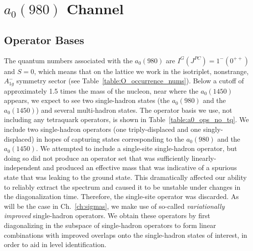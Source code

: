 \section{$a_0(980)$ Channel}\label{sec:a0}
\subsection{Operator Bases}
The quantum numbers associated with the $a_0(980)$ are $I^G(J^{PC}) = 1^-(0^{++})$ and $S = 0$, which means that on the lattice we work in the isotriplet, nonstrange, $A_{1g}^-$ symmetry sector (see Table~\ref{table:O_occurrence_nums}). Below a cutoff of approximately 1.5 times the mass of the nucleon, near where the $a_0(1450)$ appears, we expect to see two single-hadron states (the $a_0(980)$ and the $a_0(1450)$) and several multi-hadron states. The operator basis we use, not including any tetraquark operators, is shown in Table~\ref{table:a0_ops_no_tq}. We include two single-hadron operators (one triply-displaced and one singly-displaced) in hopes of capturing states corresponding to the $a_0(980)$ and the $a_0(1450)$. We attempted to include a single-site single-hadron operator, but doing so did not produce an operator set that was sufficiently linearly-independent and produced an effective mass that was indicative of a spurious state that was leaking to the ground state. This dramatically affected our ability to reliably extract the spectrum and caused it to be unstable under changes in the diagonalization time. Therefore, the single-site operator was discarded. As will be the case in Ch.~\ref{ch:sigmas}, we make use of so-called \emph{variationally improved} single-hadron operators. We obtain these operators by first diagonalizing in the subspace of single-hadron operators to form linear combinations with improved overlaps onto the single-hadron states of interest, in order to aid in level identification.


